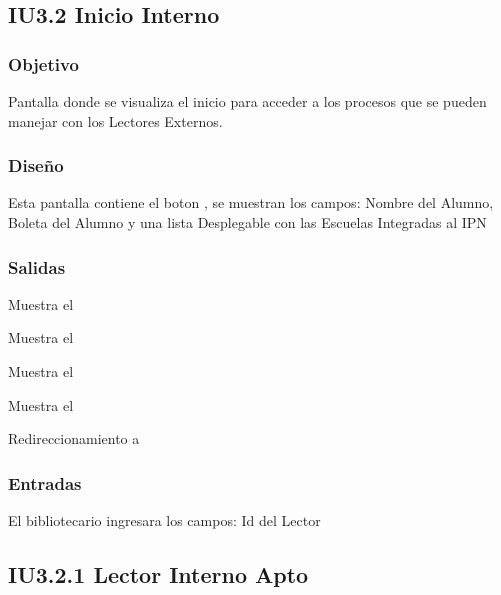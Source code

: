 \newpage
\subsection{IU3.2 Inicio Interno}

\subsubsection{Objetivo}
	Pantalla donde se visualiza el inicio para acceder a los procesos que se pueden manejar con los Lectores Externos. 

\subsubsection{Diseño}
	Esta pantalla contiene el boton , se muestran los campos: Nombre del Alumno, Boleta del Alumno y una lista Desplegable con las Escuelas Integradas al IPN


\subsubsection{Salidas}
	\begin{Citemize}
		\item Muestra el 
		\item Muestra el 
		\item Muestra el 
		\item Muestra el 
		\item Redireccionamiento a 
	\end{Citemize}
	
\subsubsection{Entradas}
	\begin{Citemize}
		\item El bibliotecario ingresara los campos: Id del Lector
	\end{Citemize}
	
\newpage
\subsection{IU3.2.1 Lector Interno Apto}

